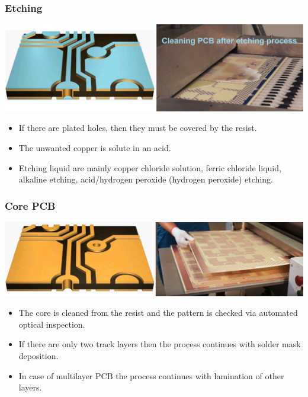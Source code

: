 \documentclass{beamer}
\begin{document}
	\begin{frame}
    \frametitle{Etching}

		\begin{center}
			\includegraphics[scale=0.15]{obr08_jadroLeptani.png}
		\end{center}
		
		\begin{itemize}
			\item If there are plated holes, then they must be covered by the resist.
			\item The unwanted copper is solute in an acid.
			\item Etching liquid are mainly copper chloride solution, ferric chloride liquid, alkaline etching, acid/hydrogen peroxide (hydrogen peroxide) etching.
		\end{itemize}
	\end{frame}
	\begin{frame}
    \frametitle{Core PCB}

		\begin{center}
			\includegraphics[scale=0.15]{obr09_jadroHotovo.png}
		\end{center}
		
		\begin{itemize}
			\item The core is cleaned from the resist and the pattern is checked via automated optical inspection.
			\item If there are only two track layers then the process continues with solder mask deposition.
			\item In case of multilayer PCB the process continues with lamination of other layers.
		\end{itemize}
	\end{frame}
\end{document}
